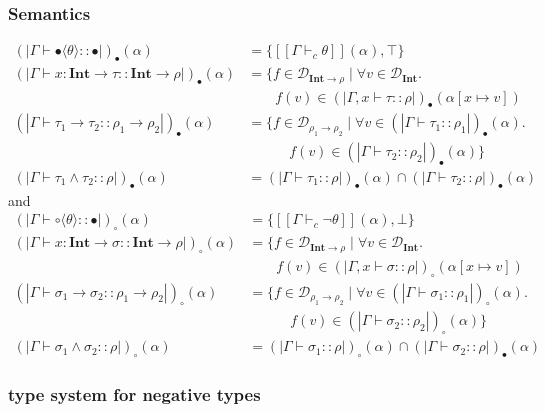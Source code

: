 \documentclass[runningheads]{llncs}
\newcommand {\val}[1]{[\![#1]\!]}
\newcommand {\domain}[1]{\mathcal{D}_{#1}}
\newcommand \stypeint {\textbf{Int}}
\newcommand \stypebool {\bullet}
\newcommand \stypeboolf {\circ}
\newcommand \srtype {\rho} %
\newcommand \constraint {\theta}
\newcommand \refty {\tau}
\newcommand \typeint[1]{{#1} : \stypeint}
\newcommand \typebool[1]{\stypebool \langle #1 \rangle}
\newcommand \typeboolf[1]{\stypeboolf \langle #1 \rangle}
\newcommand \refines[2]{#1:: #2}
\newcommand \tenv {\Gamma}
\newcommand \wf[2]{\tenv \vdash \refines{#1}{#2}}
\newcommand {\semt}[1]{(\!|#1|\!)_\bullet}
\newcommand {\srt}[2]{\semt{\wf{#1}{#2}}(\alpha)}
\newcommand {\semtf}[1]{(\!|#1|\!)_\circ}
\newcommand {\srtf}[2]{\semtf{\wf{#1}{#2}}(\alpha)}
\newcommand {\intersect} {\land}
\begin{document}
\subsubsection{Semantics}

\begin{align*}
    \srt{\typebool{\constraint}}{\stypebool} &= \{\val{\tenv \vdash_c \constraint}(\alpha), \top \}\\
    \srt{\typeint{x} \rightarrow \refty}{\stypeint \rightarrow \srtype} &=
      \{f \in \domain{\stypeint \rightarrow \srtype} \mid \forall v \in \domain{\stypeint}. \\
          &\quad \quad f(v) \in \semt{\tenv, x \vdash \refty:: \srtype}(\alpha[x \mapsto v])\\
    \srt{\refty_1 \rightarrow \refty_2}{\srtype_1 \rightarrow \srtype_2} &= \{f \in \domain{\srtype_1 \rightarrow \srtype_2} \mid \forall v \in
        \srt{\refty_1}{\srtype_1}. \\
          &\quad \quad \quad f(v) \in \srt{\refty_2}{\srtype_2}\}\\
    \srt{\refty_1 \intersect \refty_2}{\srtype} &=
    \srt{\refty_1}{\srtype} \cap \srt{\refty_2}{\srtype}
\end{align*}
and
\begin{align*}
    \srtf{\typeboolf{\constraint}}{\stypebool} &= \{\val{\tenv \vdash_c \lnot \constraint}(\alpha), \bot \}\\
    \srtf{\typeint{x} \rightarrow \sigma}{\stypeint \rightarrow \srtype} &=
      \{f \in \domain{\stypeint \rightarrow \srtype} \mid \forall v \in \domain{\stypeint}. \\
          &\quad \quad f(v) \in \semtf{\tenv, x \vdash \sigma :: \srtype}(\alpha[x \mapsto v])\\
    \srtf{\sigma_1 \rightarrow \sigma_2}{\srtype_1 \rightarrow \srtype_2} &= \{f \in \domain{\srtype_1 \rightarrow \srtype_2} \mid \forall v \in
        \srtf{\sigma_1}{\srtype_1}. \\
          &\quad \quad \quad f(v) \in \srtf{\sigma_2}{\srtype_2}\}\\
    \srtf{\sigma_1 \intersect \sigma_2}{\srtype} &=
    \srtf{\sigma_1}{\srtype} \cap \srt{\sigma_2}{\srtype}
\end{align*}

\subsubsection{type system for negative types}
\end{document}
